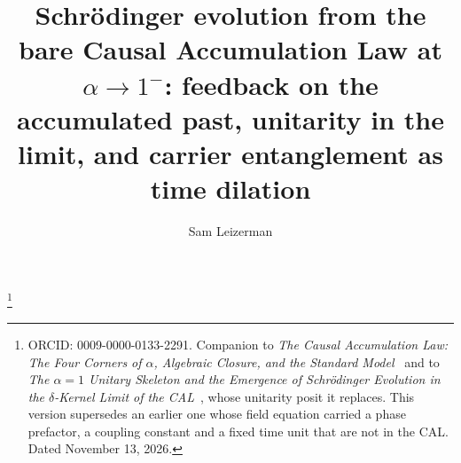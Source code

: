 \documentclass[11pt]{amsart}
\theoremstyle{definition}
\theoremstyle{remark}
\begin{document}
\title[Schr\"odinger from the bare CAL at $\alpha\to1^-$]{Schr\"odinger evolution from the bare Causal Accumulation Law at $\alpha\to1^-$: feedback on the accumulated past, unitarity in the limit, and carrier entanglement as time dilation}

\author{Sam Leizerman}
\address{LIOR Research Initiative}
\thanks{ORCID: 0009-0000-0133-2291. Companion to \emph{The Causal Accumulation Law: The Four Corners of $\alpha$, Algebraic Closure, and the Standard Model}~\cite{CAL} and to \emph{The $\alpha=1$ Unitary Skeleton and the Emergence of Schr\"odinger Evolution in the $\delta$-Kernel Limit of the CAL}~\cite{Skeleton}, whose unitarity posit it replaces. This version supersedes an earlier one whose field equation carried a phase prefactor, a coupling constant and a fixed time unit that are not in the CAL. Dated November 13, 2026.}
\end{document}
